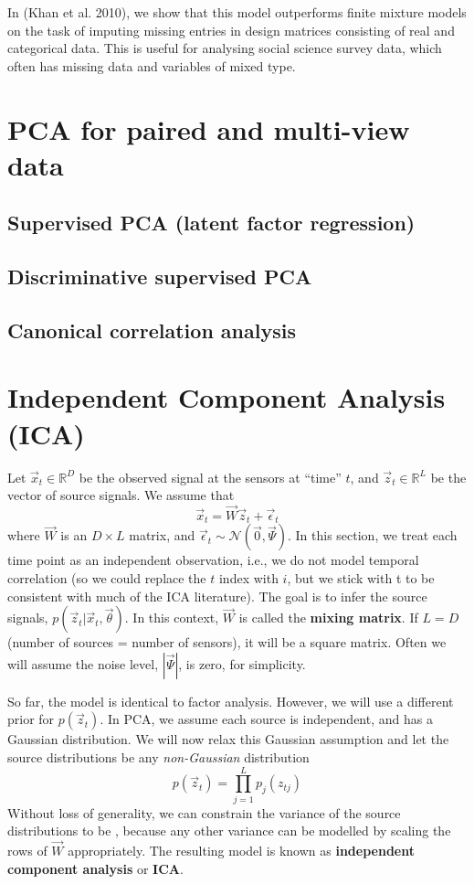 In (Khan et al. 2010), we show that this model outperforms finite mixture models on the task of imputing missing entries in design matrices consisting of real and categorical data. This is useful for analysing social science survey data, which often has missing data and variables of mixed type.


\section{PCA for paired and multi-view data}


\subsection{Supervised PCA (latent factor regression)}


\subsection{Discriminative supervised PCA}


\subsection{Canonical correlation analysis}


\section{Independent Component Analysis (ICA)}
\label{sec:ICA}
Let $\vec{x}_t \in \mathbb{R}^D$ be the observed signal at the sensors at “time” $t$, and $\vec{z}_t \in \mathbb{R}^L$ be the vector of source signals. We assume that
\begin{equation}
\vec{x}_t=\vec{W}\vec{z}_t+\vec{\epsilon}_t
\end{equation}
where $\vec{W}$ is an $D \times L$ matrix, and $\vec{\epsilon}_t \sim \mathcal{N}(\vec{0},\vec{\Psi})$. In this section, we treat each time point as an independent observation, i.e., we do not model temporal correlation (so we could replace the $t$ index with $i$, but we stick with t to be consistent with much of the ICA literature). The goal is to infer the source signals, $p(\vec{z}_t|\vec{x}_t,\vec{\theta})$. In this context, $\vec{W}$ is called the \textbf{mixing matrix}. If $L=D$ (number of sources = number of sensors), it will be a square matrix. Often we will assume the noise level, $|\vec{\Psi}|$, is zero, for simplicity.

So far, the model is identical to factor analysis. However, we will use a different prior for $p(\vec{z}_t)$. In PCA, we assume each source is independent, and has a Gaussian distribution. We will now relax this Gaussian assumption and let the source distributions be any \emph{non-Gaussian} distribution
\begin{equation}
p(\vec{z}_t) =\prod\limits_{j=1}^L p_j(z_{tj})
\end{equation}
Without loss of generality, we can constrain the variance of the source distributions to be , because any other variance can be modelled by scaling the rows of $\vec{W}$ appropriately. The resulting model is known as \textbf{independent component analysis} or \textbf{ICA}.

